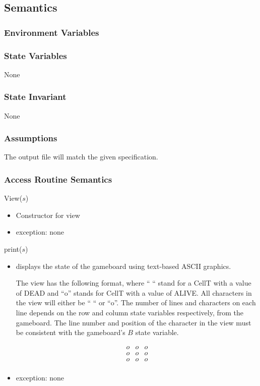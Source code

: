 \documentclass[12pt]{article}
\begin{document}
\subsection* {Semantics}

\subsubsection* {Environment Variables}

\subsubsection* {State Variables}

None

\subsubsection* {State Invariant}

None

\subsubsection* {Assumptions}

The output file will match the given specification.

\subsubsection* {Access Routine Semantics}

\noindent View($s$)
\begin{itemize}
\item Constructor for view

\item exception: none
\end{itemize}

\noindent print($s$)
\begin{itemize}
\item displays the state of the gameboard using text-based ASCII graphics. 

The view has the following format, where `` `` stand for a CellT with a value of DEAD  and ``o'' stands for CellT with a value of ALIVE. All characters in the view will either be `` `` or  ``o''. The number of lines and characters on each line depends on the row and column state variables respectively, from the gameboard. The line number and position of the character in the view must be consistent with the gameboard's $B$ state variable. 

  \begin{equation}
    \begin{array}{ccc}
      o & o & o   \\
      o & o & o   \\
      o & o & o  \\

    \end{array}
  \end{equation}

\item exception: none
\end{itemize}
\end{document}

